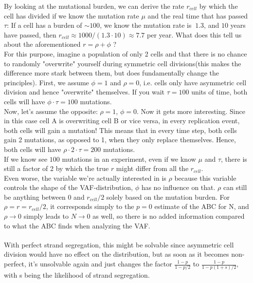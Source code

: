 \documentclass{article}
\numberwithin{equation}{subsection}
\begin{document}
	By looking at the mutational burden, we can derive the rate $ r_{cell} $ by which the cell has divided if we know the mutation rate $ \mu $ and the real time that has passed $ \tau $: If a cell has a burden of $ \sim 100$, we know the mutation rate is $ ~1.3 $, and $ 10 $ years have passed, then $ r_{cell} \approx 1000/(1.3 \cdot 10) \approx 7.7 $ per year. What does this tell us about the aforementioned $r = \rho +\phi$ ? \\
	For this purpose, imagine a population of only 2 cells and that there is no chance to randomly "overwrite" yourself during symmetric cell divisions(this makes the difference more stark between them, but does fundamentally change the principles). First, we assume $ \phi = 1$ and $ \rho = 0$, i.e. cells only have asymmetric cell division and hence "overwrite" themselves. If you wait $\tau = 100$ units of time, both cells will have $ \phi \cdot \tau = 100$ mutations.\\
	Now, let's assume the opposite: $ \rho = 1$, $ \phi = 0$. Now it gets more interesting. Since in this case cell A is overwriting cell B or vice versa, in every replication event, both cells will gain a mutation! This means that in every time step, both cells gain 2 mutations, as opposed to 1, when they only replace themselves. Hence, both cells will have $ \rho \cdot 2 \cdot \tau = 200 $ mutations.\\
	If we know see $ 100 $ mutations in an experiment, even if we know $ \mu $ and $ \tau $, there is still a factor of 2 by which the true $ r $ might differ from all the $ r_{cell} $.\\
	Even worse, the variable we're actually interested in is $ \rho $ because this variable controls the shape of the VAF-distribution, $ \phi $ has no influence on that. $ \rho $ can still be anything between 0 and $ r_{cell}/2 $ solely based on the mutation burden. For $\rho = r = r_{cell}/2 $, it corresponds simply to the $p=0$ estimate of the ABC for N, and  $ \rho \rightarrow 0 $ simply leads to $ N \rightarrow 0 $ as well, so there is no added information compared to what the ABC finds when analyzing the VAF. \\
	\\
	With perfect strand segregation, this might be solvable since asymmetric cell division would have no effect on the distribution, but as soon as it becomes non-perfect, it's unsolvable again and just changes the factor $ \frac{1 - p}{ 1 - p/2} $ to $ \frac{1 - p}{ 1 - p(1+s)/2} $, with s being the likelihood of strand segregation.
\end{document}
